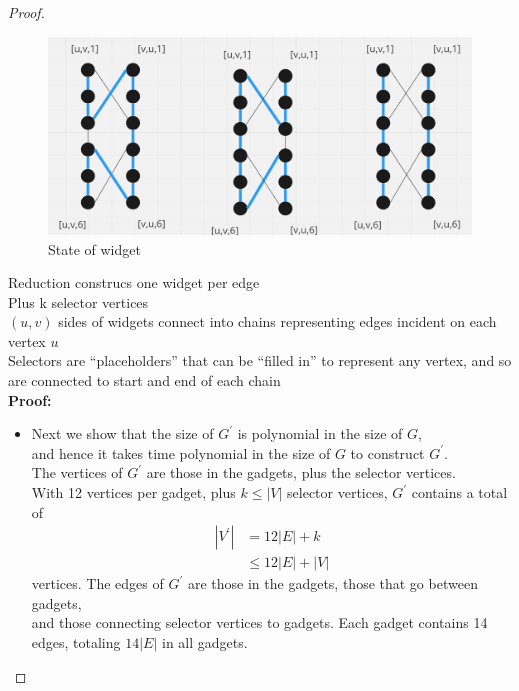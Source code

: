 \documentclass{article}
\begin{document}
\begin{proof}
\begin{itemize}
\begin{figure}
        \end{figure}
        \begin{figure}
            \includegraphics[width=\linewidth]{Figure_3.png}
            \caption{State of widget}
            \label{fig:3}
        \end{figure}
        Reduction construcs one widget per edge \\
        Plus k selector vertices \\
        $(u,v)$ sides of widgets connect into chains representing edges incident on each vertex $u$ \\
        Selectors are “placeholders” that can be “filled in” to represent any vertex, and so are connected to start and end of each chain \\
        \textbf{Proof:} \\
        \begin{itemize}
            \item Next we show that the size of $G^{\prime}$ is polynomial in the size of $G$, \\
            and hence it takes time polynomial in the size of $G$ to construct $G^{\prime}$. \\
            The vertices of $G^{\prime}$ are those in the gadgets, plus the selector vertices. \\
            With 12 vertices per gadget, plus $k \leq|V|$ selector vertices, $G^{\prime}$ contains a total of \\
            $$
            \begin{aligned}
            \left|V^{\prime}\right| & =12|E|+k \\
            & \leq 12|E|+|V|
            \end{aligned}
            $$
            vertices. The edges of $G^{\prime}$ are those in the gadgets, those that go between gadgets, \\
            and those connecting selector vertices to gadgets. Each gadget contains 14 edges, totaling $14|E|$ in all gadgets. \\

\end{itemize}
\end{itemize}
\end{proof}
\end{document}
